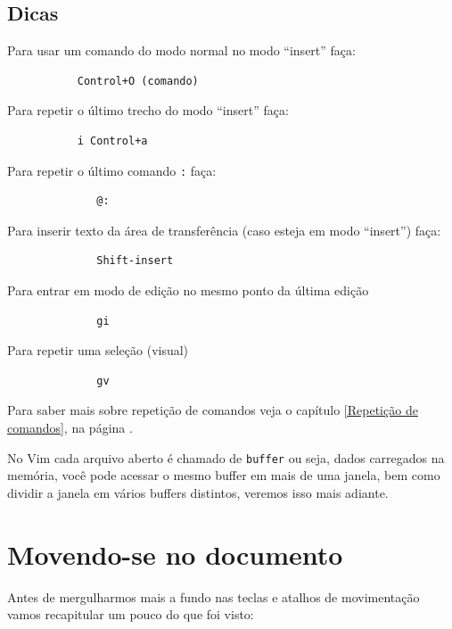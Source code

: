 \documentclass[10pt,a4paper,openany]{book}
\begin{document}
\section{Dicas}
\label{Dicas}
Para usar um comando do modo normal no modo ``insert'' faça:

\begin{verbatim}
		   Control+O (comando)
\end{verbatim}

Para repetir o último trecho do modo ``insert'' faça:

\begin{verbatim}
		   i Control+a
\end{verbatim}

Para repetir o último comando \verb+:+ faça:

\begin{verbatim}
			  @:
\end{verbatim}

Para inserir texto da área de transferência (caso esteja em modo ``insert'') faça:

\begin{verbatim}
			  Shift-insert
\end{verbatim}

Para entrar em modo de edição no mesmo ponto da última edição

\begin{verbatim}
			  gi
\end{verbatim}

Para repetir uma seleção (visual)

\begin{verbatim}
			  gv
\end{verbatim}

Para saber mais sobre repetição de comandos veja o capítulo \ref{Repetição de comandos},
na página \pageref{Repetição de comandos}.

No Vim cada arquivo aberto é chamado de \verb|buffer| ou seja, dados
carregados na memória, você pode acessar o mesmo buffer em mais de uma
janela, bem como dividir a janela em vários buffers distintos, veremos
isso mais adiante.

\chapter{Movendo-se no documento}\label{cha:Movendo-se no documento}

Antes de mergulharmos mais a fundo nas teclas e atalhos de
movimentação vamos recapitular um pouco do que foi visto: \\
\end{document}

